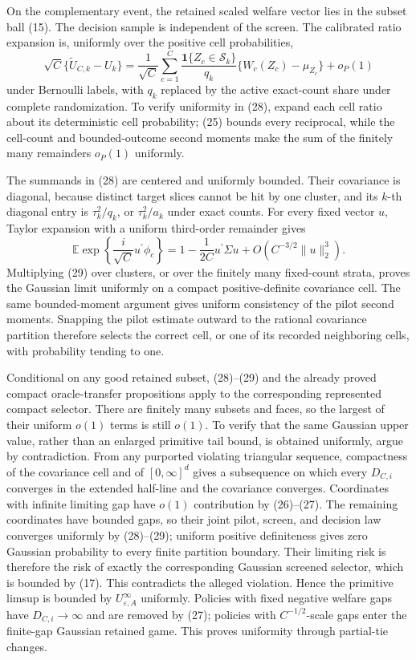 On the complementary event, the retained scaled welfare vector lies in the subset ball (15).  The decision sample is independent of the screen.  The calibrated ratio expansion is, uniformly over the positive cell probabilities,
\[
\sqrt C\{\widetilde U_{C,k}-U_k\}
=\frac1{\sqrt C}\sum_{c=1}^C
\frac{\mathbf1\{Z_c\in\mathcal S_k\}}{q_k}
\{W_c(Z_c)-\mu_{Z_c}\}+o_P(1) \tag{28}
\]
under Bernoulli labels, with \(q_k\) replaced by the active exact-count share under complete randomization.  To verify uniformity in (28), expand each cell ratio about its deterministic cell probability; (25) bounds every reciprocal, while the cell-count and bounded-outcome second moments make the sum of the finitely many remainders \(o_P(1)\) uniformly.

The summands in (28) are centered and uniformly bounded.  Their covariance is diagonal, because distinct target slices cannot be hit by one cluster, and its \(k\)-th diagonal entry is \(\tau_k^2/q_k\), or \(\tau_k^2/a_k\) under exact counts.  For every fixed vector \(u\), Taylor expansion with a uniform third-order remainder gives
\[
\mathbb E\exp\!\left\{\frac{i}{\sqrt C}u^{\prime}\phi_c\right\}
=1-\frac1{2C}u^{\prime}\Sigma u+O(C^{-3/2}\lVert u\rVert_2^3). \tag{29}
\]
Multiplying (29) over clusters, or over the finitely many fixed-count strata, proves the Gaussian limit uniformly on a compact positive-definite covariance cell.  The same bounded-moment argument gives uniform consistency of the pilot second moments.  Snapping the pilot estimate outward to the rational covariance partition therefore selects the correct cell, or one of its recorded neighboring cells, with probability tending to one.

Conditional on any good retained subset, (28)--(29) and the already proved compact oracle-transfer propositions apply to the corresponding represented compact selector.  There are finitely many subsets and faces, so the largest of their uniform \(o(1)\) terms is still \(o(1)\).  To verify that the same Gaussian upper value, rather than an enlarged primitive tail bound, is obtained uniformly, argue by contradiction.  From any purported violating triangular sequence, compactness of the covariance cell and of \([0,\infty]^d\) gives a subsequence on which every \(D_{C,i}\) converges in the extended half-line and the covariance converges.  Coordinates with infinite limiting gap have \(o(1)\) contribution by (26)--(27).  The remaining coordinates have bounded gaps, so their joint pilot, screen, and decision law converges uniformly by (28)--(29); uniform positive definiteness gives zero Gaussian probability to every finite partition boundary.  Their limiting risk is therefore the risk of exactly the corresponding Gaussian screened selector, which is bounded by (17).  This contradicts the alleged violation.  Hence the primitive limsup is bounded by \(U^{\infty}_{\varepsilon,A}\) uniformly.  Policies with fixed negative welfare gaps have \(D_{C,i}\to\infty\) and are removed by (27); policies with \(C^{-1/2}\)-scale gaps enter the finite-gap Gaussian retained game.  This proves uniformity through partial-tie changes.

